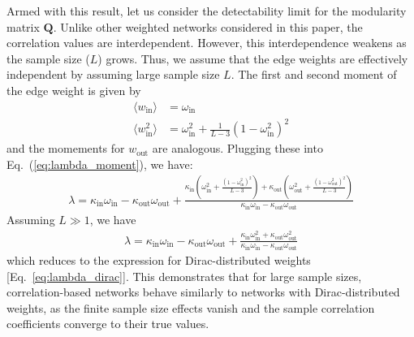 \documentclass[a4paper,pre,superscriptaddress,floatfix,nofootinbib,twocolumn]{revtex4-1}
\begin{document}
Armed with this result, let us consider the detectability limit for the modularity matrix $\mathbf{Q}$.
Unlike other weighted networks considered in this paper, the correlation values are interdependent.
However, this interdependence weakens as the sample size ($L$) grows. Thus, we assume that the edge weights are effectively independent by assuming large sample size $L$.
The first and second moment of the edge weight is given by
\begin{align}
    \langle w_\text{in} \rangle &=  \omega_\text{in} \\
    \langle w_\text{in}^2 \rangle &= \omega_\text{in}^2 +  \frac{1}{L-3} \left(1 - \omega_\text{in}^2\right)^2
\end{align}
and the momements for $w_{\text{out}}$ are analogous.
Plugging these into Eq.~(\ref{eq:lambda_moment}), we have:
\begin{align}
    \lambda =\kappa_{\text{in}} \omega_{\text{in}} - \kappa_{\text{out}} \omega_{\text{out}} +  \frac{\kappa_{\text{in}} \left(\omega_{\text{in}}^{2} + \frac{\left(1 - \omega_{\text{in}}^{2}\right)^{2}}{L - 3}\right) + \kappa_{\text{out}} \left(\omega_{\text{out}}^{2} + \frac{\left(1 - \omega_{\text{out}}^{2}\right)^{2}}{L - 3}\right)}{\kappa_{\text{in}} \omega_{\text{in}} - \kappa_{\text{out}} \omega_{\text{out}}}
\end{align}
Assuming $L \gg 1$, we have
\begin{align}
    \lambda =\kappa_{\text{in}} \omega_{\text{in}} - \kappa_{\text{out}} \omega_{\text{out}} +  \frac{\kappa_{\text{in}} \omega_{\text{in}}^{2} + \kappa_{\text{out}} \omega_{\text{out}}^{2}}{\kappa_{\text{in}} \omega_{\text{in}} - \kappa_{\text{out}} \omega_{\text{out}}}
\end{align}
which reduces to the expression for Dirac-distributed weights [Eq.~\eqref{eq:lambda_dirac}]. This demonstrates that for large sample sizes, correlation-based networks behave similarly to networks with Dirac-distributed weights, as the finite sample size effects vanish and the sample correlation coefficients converge to their true values.
\end{document}
